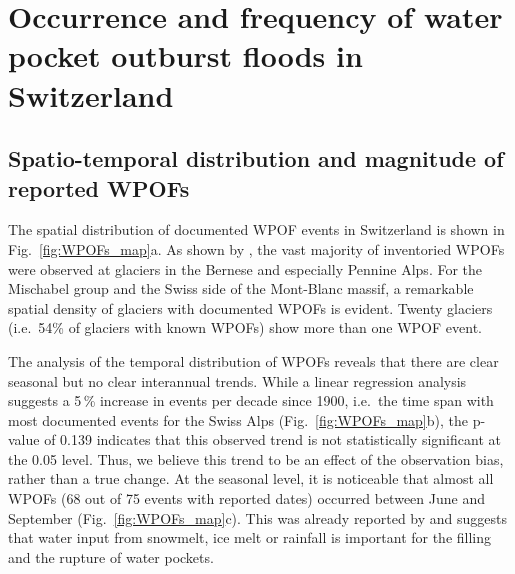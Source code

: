 \section{ Occurrence and frequency of water pocket outburst floods in Switzerland}
\label{sec:inventary}

\subsection{ Spatio-temporal distribution and magnitude of reported WPOFs}
\label{Sec:Spatio_temporal}

The spatial distribution of documented WPOF events in Switzerland is shown in Fig.~\ref{fig:WPOFs_map}a. As shown by \citet{Haeberli1983}, the vast majority of inventoried WPOFs were observed at glaciers in the Bernese and especially Pennine Alps. For the Mischabel group and the Swiss side of the Mont-Blanc massif, a remarkable spatial density of glaciers with documented WPOFs is evident. Twenty glaciers (i.e.\ 54\% of glaciers with known WPOFs) show more than one WPOF event. 


The analysis of the temporal distribution of WPOFs reveals that there are clear seasonal but no clear interannual trends. While a linear regression analysis suggests a 5\,\% increase in events per decade since 1900, i.e.\ the time span with most documented events for the Swiss Alps (Fig.~\ref{fig:WPOFs_map}b), the p-value of 0.139 indicates that this observed trend is not statistically significant at the 0.05 level. Thus, we believe this trend to be an effect of the observation bias, rather than a true change. At the seasonal level, it is noticeable that almost all WPOFs (68 out of 75 events with reported dates) occurred between June and September (Fig.~\ref{fig:WPOFs_map}c). This was already reported by \cite{Haeberli1983} and suggests that water input from snowmelt, ice melt or rainfall is important for the filling and the rupture of water pockets. 

